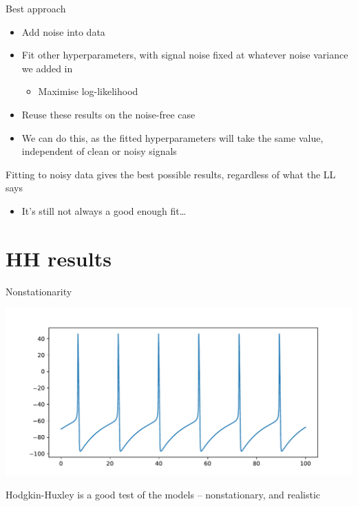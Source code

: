 \documentclass[presentation]{beamer}
\begin{document}
\begin{frame}[label={sec:orgac78912}]{Best approach}
\begin{itemize}
\item Add noise into data
\item Fit other hyperparameters, with signal noise fixed at whatever noise variance we added in
\begin{itemize}
\item Maximise log-likelihood
\end{itemize}
\item Reuse these results on the noise-free case
\item We can do this, as the fitted hyperparameters will take the same value, independent of clean or noisy signals

\vfill
\end{itemize}

Fitting to noisy data gives the best possible results, regardless of what the LL says
\begin{itemize}
\item It's still not always a good enough fit\ldots{}
\end{itemize}
\end{frame}

\section{HH results}
\label{sec:orgdaf383b}
\begin{frame}[label={sec:orgd32516e}]{Nonstationarity}
\begin{center}
\includegraphics[width=.9\textwidth]{./HHraw.pdf}
\end{center}

Hodgkin-Huxley is a good test of the models -- nonstationary, and realistic
\end{frame}
\end{document}
